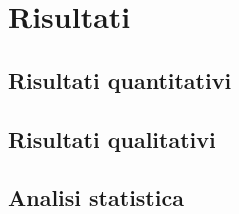 \chapter{Risultati}
\label{cap:risultati}


\section{Risultati quantitativi}
\label{sec:risultati-quantitativi}

\section{Risultati qualitativi}
\label{sec:risultati-qualitativi}

\section{Analisi statistica}
\label{sec:analisi-statistica}
